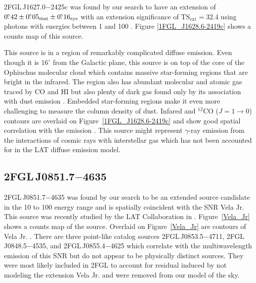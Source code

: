 \documentclass[12pt,preprint]{aastex}
\newcommand{\gev}{\text{GeV}\xspace}
\newcommand{\tev}{\text{TeV}\xspace}
\newcommand{\tsext}{{\ensuremath{\text{TS}_{\text{ext}}}}\xspace}
\newcommand{\sys}{\text{sys}\xspace}
\newcommand{\stat}{\text{stat}\xspace}
\newcommand{\degree}{^\circ\xspace}
\begin{document}

2FGL\,J1627.0$-$2425c was found by our search to
have an extension of $0\fdg42\pm0\fdg05_\stat\pm0\fdg16_\sys$ with
an extension significance of $\tsext=32.4$
using photons with energies between 1 \gev and 100 \gev.  
Figure \ref{1FGL_J1628.6-2419c} shows a counts map of this source.

This source is in a region of remarkably complicated diffuse emission.
Even though it is $16\degree$ from the Galactic plane, this source is on
top of the core of the Ophiuchus molecular cloud which contains massive
star-forming regions that are bright in the infrared.  The region also has
abundant molecular and atomic gas traced by CO and HI but also plenty of
dark gas found only by its association with dust emission
\citep{isabelle_dark_gass}. Embedded star-forming regions make it even
more challenging to measure the column density of dust.  Infared and 
${}^{12}\text{CO}$ ($J=1\rightarrow 0$)
contours are overlaid on Figure~\ref{1FGL_J1628.6-2419c} and show good
spatial correlation with the \gev emission \citep{iras_rho_ophiuci,co_rho_ophiuci}.
This source might 
represent $\gamma$-ray emission from the interactions of cosmic rays with
interstellar gas which has not been accounted for in the LAT diffuse
emission model.


\subsection{2FGL\,J0851.7$-$4635}
\label{section_2FGL_J0851.7-4635}


2FGL\,J0851.7$-$4635 was found by our search to be an extended source
candidate in the 10 \gev to 100 \gev energy range and is spatially
coincident with the SNR Vela Jr. This source was recently studied by the LAT
Collaboration in \cite{vela_jr_lat}.  Figure~\ref{Vela_Jr} shows a counts
map of the source.  Overlaid on Figure~\ref{Vela_Jr} are \tev
contours of Vela Jr. \citep{vela_jr_hess}.
There are three
point-like catalog sources 2FGL\,J0853.5$-$4711, 2FGL\,J0848.5$-$4535,
and 2FGL\,J0855.4$-$4625 which correlate with the 
multiwavelength
emission of
this SNR but do not appear to be physically distinct sources.
They were most likely included in 2FGL to account for residual
induced by not modeling the extension Vela Jr. and were removed
from our model of the sky.  
\end{document}
